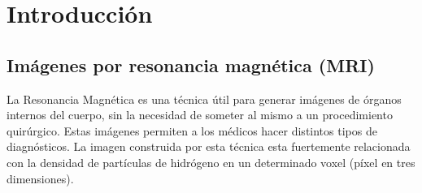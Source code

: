 \documentclass[11pt,a4paper,twoside]{tesis}
\begin{document}
\def\titulo{Licenciado }

\def\autor{Leonel Exequiel G\'omez}
\def\tituloTesis{La Guerra de las Galaxias: \mbox{Rebelión e Imperio}}
\def\runtitulo{La Guerra de las Galaxias: Rebelión e Imperio}
\def\runtitle{Star Wars: Rebellion and Empire}
\def\director{Obi-Wan Kenobi}
\def\codirector{Master Yoda}
\def\lugar{Buenos Aires, 2011}


\frontmatter
\pagestyle{empty}


\cleardoublepage


\cleardoublepage

\cleardoublepage

\cleardoublepage
\tableofcontents

\mainmatter
\pagestyle{headings}



\chapter{Introducci\'on}
\section{Imágenes por resonancia magnética (MRI)}




La Resonancia Magn\'etica es una t\'ecnica útil para generar im\'agenes de 
\'organos internos del cuerpo, sin la necesidad de someter al mismo a un 
procedimiento quir\'urgico. Estas im\'agenes permiten a los m\'edicos hacer distintos tipos de 
diagn\'osticos. La imagen construida por esta t\'ecnica esta fuertemente 
relacionada con la densidad de part\'iculas de hidr\'ogeno en un determinado 
voxel (p\'ixel en tres dimensiones).
\end{document}
